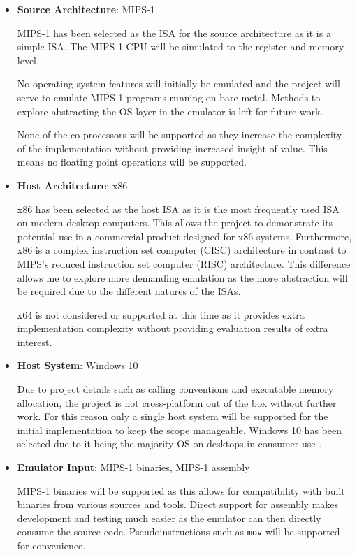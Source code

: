 \begin{itemize}
    \item \textbf{Source Architecture}: MIPS-1
    
    MIPS-1 has been selected as the ISA for the source architecture as it is a simple ISA. The MIPS-1 CPU will be simulated to the register and memory level.

    No operating system features will initially be emulated and the project will serve to emulate MIPS-1 programs running on bare metal. Methods to explore abstracting the OS layer in the emulator is left for future work.

    None of the co-processors will be supported as they increase the complexity of the implementation without providing increased insight of value. This means no floating point operations will be supported.
    
    \item \textbf{Host Architecture}: x86
    
    x86 has been selected as the host ISA as it is the most frequently used ISA on modern desktop computers. This allows the project to demonstrate its potential use in a commercial product designed for x86 systems. Furthermore, x86 is a complex instruction set computer (CISC) architecture in contrast to MIPS's reduced instruction set computer (RISC) architecture. This difference allows me to explore more demanding emulation as the more abstraction will be required due to the different natures of the ISAs.
    
    x64 is not considered or supported at this time as it provides extra implementation complexity without providing evaluation results of extra interest.
    
    \item \textbf{Host System}: Windows 10
    
    Due to project details such as calling conventions and executable memory allocation, the project is not cross-platform out of the box without further work. For this reason only a single host system will be supported for the initial implementation to keep the scope manageable. Windows 10 has been selected due to it being the majority OS on desktops in consumer use \cite{desktop-os-share, win-os-share}.
    
    \item \textbf{Emulator Input}: MIPS-1 binaries, MIPS-1 assembly
    
    MIPS-1 binaries will be supported as this allows for compatibility with built binaries from various sources and tools. Direct support for assembly makes development and testing much easier as the emulator can then directly consume the source code. Pseudoinstructions such as \texttt{mov} will be supported for convenience.


\end{itemize}

